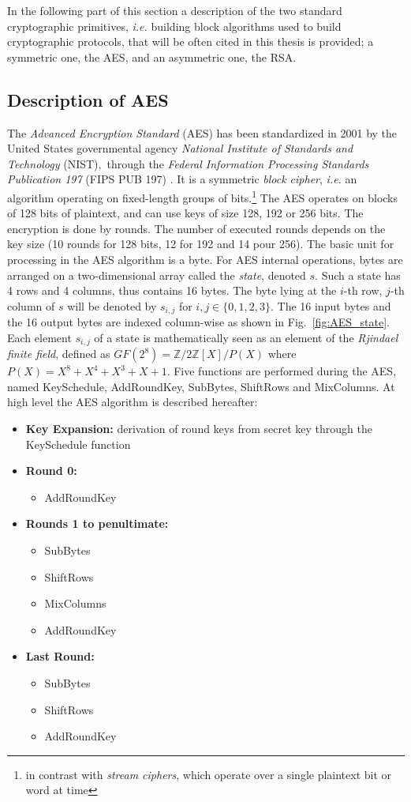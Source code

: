 In the following part of this section a description of the two standard cryptographic primitives, \emph{i.e.} building block algorithms used to build cryptographic protocols, that will be often cited in this thesis is provided; a symmetric one, the AES, and an asymmetric one, the RSA. 
\subsection{Description of AES}
The \emph{Advanced Encryption Standard} (AES) has been standardized in 2001 by the United States governmental agency \emph{National Institute of Standards and Technology} (NIST),\ through the \emph{Federal Information
Processing Standards Publication 197 } (FIPS PUB 197) \cite{nist197}. It is a symmetric \emph{block cipher}, \emph{i.e.} an algorithm operating on fixed-length groups of bits.\footnote{in contrast with \emph{stream ciphers}, which operate over a single plaintext bit or word at time} The AES operates on blocks of 128 bits of plaintext, and can use keys of size 128, 192 or 256 bits. The encryption is done by rounds. The number of executed rounds depends on the key size (10 rounds for 128 bits, 12 for 192 and 14 pour 256). The basic unit for processing in the AES algorithm is a byte. For AES internal operations, bytes are arranged on a two-dimensional array called the \emph{state}, denoted $s$. Such a state has 4 rows and 4 columns, thus contains 16 bytes. The byte lying at the $i$-th row, $j$-th column of $s$ will be denoted by $s_{i,j}$ for $i,j\in\{0,1,2,3\}$. The 16 input bytes and the 16 output bytes are indexed column-wise as shown in Fig.~\ref{fig:AES_state}. Each element $s_{i,j}$ of a state is mathematically seen as an element of the \emph{Rjindael finite field}, defined as $GF(2^8) = \mathbb{Z}/{2\mathbb{Z}[X]}/P(X)$ where $P(X) = X^8 + X^4 + X^3 + X + 1$. Five functions are performed during the AES, named KeySchedule, AddRoundKey, SubBytes, ShiftRows and MixColumns. At high level the AES algorithm is described hereafter:
\begin{itemize}
\item[]\textbf{Key Expansion:}  derivation of round keys from secret key through the KeySchedule function
\item[]\textbf{Round 0:}  
\begin{itemize}
\item[] AddRoundKey
\end{itemize}
\item[] \textbf{Rounds 1 to penultimate:}
\begin{itemize}
\item[] SubBytes
\item[] ShiftRows
\item[] MixColumns
\item[] AddRoundKey
\end{itemize}
\item[] \textbf{Last Round:}
\begin{itemize}
\item[] SubBytes
\item[] ShiftRows
\item[] AddRoundKey
\end{itemize}
\end{itemize}

